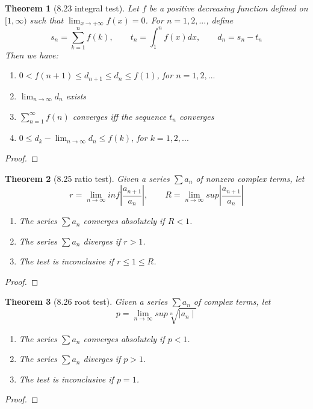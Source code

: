 \documentclass[aps,pra,notitlepage,amsmath,amssymb,letterpaper,12pt]{revtex4-1}
\newtheorem{theorem}{Theorem}
\begin{document}
\begin{theorem}[8.23 integral test]
Let $f$ be a positive decreasing function defined on $[1, \infty)$ such that $\lim_{x \to +\infty}f(x) = 0$. For $n = 1,2,...$, define
\[s_{n} = \sum_{k=1}^{n}f(k), \qquad  t_{n} = \int_{1}^{n}f(x)dx,  \qquad  d_{n}=s_{n}-t_{n}\]
Then we have:
\begin{enumerate}[\upshape a)]
  \item $0 < f(n+1) \leq d_{n+1} \leq d_{n} \leq f(1)$, \qquad for  $n=1,2,...$
  \item $\lim_{n \to \infty}d_{n}$ exists
  \item $\sum_{n=1}^{\infty}f(n)$ converges iff the sequence ${t_{n}}$ converges
  \item $0 \leq d_{k}-\lim_{n \to \infty}d_{n} \leq f(k)$, \qquad for $k=1,2,...$
\end{enumerate}
\end{theorem}
\begin{proof}
\end{proof}

\begin{theorem}[8.25 ratio test]
Given a series $\sum a_{n}$ of nonzero complex terms, let
\[r = \lim_{n \to \infty} inf \left| \frac{a_{n+1}}{a_{n}}\right|, \qquad R = \lim_{n \to \infty} sup \left| \frac{a_{n+1}}{a_{n}}\right|\]
\begin{enumerate}[\upshape a)]
  \item The series $\sum a_{n}$ converges absolutely if $R < 1$.
  \item The series $\sum a_{n}$ diverges if $r>1$.
  \item The test is inconclusive if $r \leq 1 \leq R$.
\end{enumerate}
\end{theorem}
\begin{proof}
\end{proof}

\begin{theorem}[8.26 root test]
Given a series $\sum a_{n}$ of complex terms, let
\[p = \lim_{n \to \infty} sup \sqrt[n]{\mid a_{n} \mid}\]
\begin{enumerate}[\upshape a)]
  \item The series $\sum a_{n}$ converges absolutely if $p < 1$.
  \item The series $\sum a_{n}$ diverges if $p>1$.
  \item The test is inconclusive if $p=1$.
\end{enumerate}
\end{theorem}
\begin{proof}
\end{proof}
\end{document}

